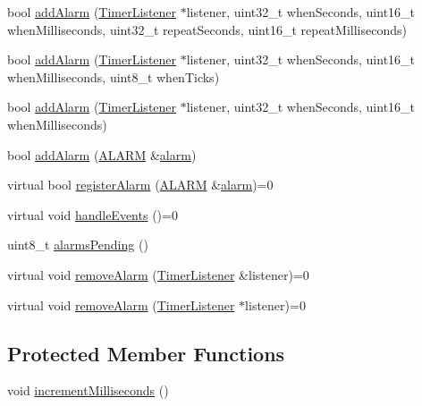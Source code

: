 \begin{DoxyCompactItemize}
\item 
bool \hyperlink{classflame_1_1_r_t_c_aa0c02e91ae48a09802ea66b1771be43f}{add\-Alarm} (\hyperlink{classflame_1_1_timer_listener}{Timer\-Listener} $\ast$listener, uint32\-\_\-t when\-Seconds, uint16\-\_\-t when\-Milliseconds, uint32\-\_\-t repeat\-Seconds, uint16\-\_\-t repeat\-Milliseconds)
\item 
bool \hyperlink{classflame_1_1_r_t_c_aa5123c2ac9201b0186edbcb988a25352}{add\-Alarm} (\hyperlink{classflame_1_1_timer_listener}{Timer\-Listener} $\ast$listener, uint32\-\_\-t when\-Seconds, uint16\-\_\-t when\-Milliseconds, uint8\-\_\-t when\-Ticks)
\item 
bool \hyperlink{classflame_1_1_r_t_c_a94834b36f4332dcabd8aee276221f8cb}{add\-Alarm} (\hyperlink{classflame_1_1_timer_listener}{Timer\-Listener} $\ast$listener, uint32\-\_\-t when\-Seconds, uint16\-\_\-t when\-Milliseconds)
\item 
bool \hyperlink{classflame_1_1_r_t_c_a787e76eee1bbece6133b6f6539d46074}{add\-Alarm} (\hyperlink{namespaceflame_a7a5a7b0bdd1b44d7d0b0a600552b5ab5}{A\-L\-A\-R\-M} \&\hyperlink{structflame_1_1alarm}{alarm})
\item 
virtual bool \hyperlink{classflame_1_1_r_t_c_a3ba19efd3cffbe55d363831996657b42}{register\-Alarm} (\hyperlink{namespaceflame_a7a5a7b0bdd1b44d7d0b0a600552b5ab5}{A\-L\-A\-R\-M} \&\hyperlink{structflame_1_1alarm}{alarm})=0
\item 
virtual void \hyperlink{classflame_1_1_r_t_c_a123414b982bd03971e057d8fcf4e45ae}{handle\-Events} ()=0
\item 
uint8\-\_\-t \hyperlink{classflame_1_1_r_t_c_afb5a72eef061c794b61ef4cc07ec5aa9}{alarms\-Pending} ()
\item 
virtual void \hyperlink{classflame_1_1_r_t_c_ad493295a4babbc7a3dd4ef18b72c4679}{remove\-Alarm} (\hyperlink{classflame_1_1_timer_listener}{Timer\-Listener} \&listener)=0
\item 
virtual void \hyperlink{classflame_1_1_r_t_c_a88d193491a668daf956bcc672f3dfc06}{remove\-Alarm} (\hyperlink{classflame_1_1_timer_listener}{Timer\-Listener} $\ast$listener)=0
\end{DoxyCompactItemize}
\subsection*{Protected Member Functions}
\begin{DoxyCompactItemize}
\item 
void \hyperlink{classflame_1_1_r_t_c_a0d6e472de2f42bebed345004d20a504d}{increment\-Milliseconds} ()
\end{DoxyCompactItemize}
